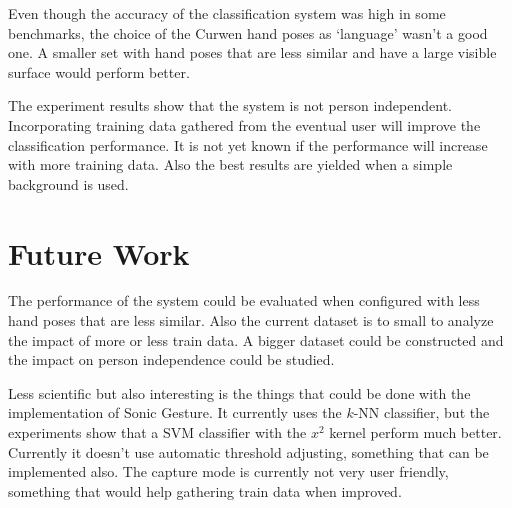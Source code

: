 Even though the accuracy of the classification system was high in some benchmarks, the choice of the Curwen hand poses as `language' wasn't a good one. A smaller set with hand poses that are less similar and have a large visible surface would perform better.

The experiment results show that the system is not person independent. Incorporating training data gathered from the eventual user will improve the classification performance. It is not yet known if the performance will increase with more training data. Also the best results are yielded when a simple background is used.

\section{Future Work}
The performance of the system could be evaluated when configured with less hand poses that are less similar. Also the current dataset is to small to analyze the impact of more or less train data. A bigger dataset could be constructed and the impact on person independence could be studied.

Less scientific but also interesting is the things that could be done with the implementation of Sonic Gesture. It currently uses the $k$-NN classifier, but the experiments show that a SVM classifier with the $x^2$ kernel perform much better. Currently it doesn't use automatic threshold adjusting, something that can be implemented also. The capture mode is currently not very user friendly, something that would help gathering train data when improved. 